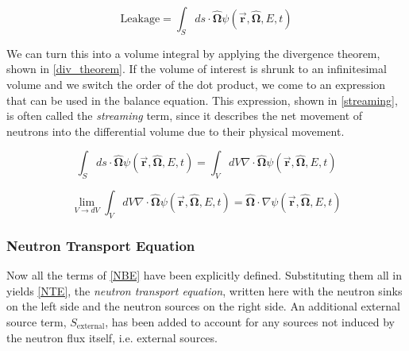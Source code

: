 \begin{equation}
\label{leakage_surface}
\mathrm{Leakage} = \int_S ds \cdot \boldsymbol{\hat{\Omega}} \psi(\boldsymbol{\vec{r}},\boldsymbol{\hat{\Omega}},E,t)
\end{equation}
 
 We can turn this into a volume integral by applying the divergence theorem, shown in \eqref{div_theorem}.  If the volume of interest is shrunk to an infinitesimal volume and we switch the order of the dot product, we come to an expression that can be used in the balance equation.  This expression, shown in \eqref{streaming}, is often called the \emph{streaming} term, since it describes the net movement of neutrons into the differential volume due to their physical movement.
 
\begin{equation}
\label{div_theorem}
\int_S ds \cdot \boldsymbol{\hat{\Omega}} \psi(\boldsymbol{\vec{r}},\boldsymbol{\hat{\Omega}},E,t) = \int_V dV \nabla \cdot \boldsymbol{\hat{\Omega}}  \psi(\boldsymbol{\vec{r}},\boldsymbol{\hat{\Omega}},E,t)
\end{equation}

\begin{equation}
\label{streaming}
 \lim_{V\to dV} \int_V dV \nabla \cdot \boldsymbol{\hat{\Omega}}  \psi(\boldsymbol{\vec{r}},\boldsymbol{\hat{\Omega}},E,t) =  \boldsymbol{\hat{\Omega}}  \cdot \nabla\psi(\boldsymbol{\vec{r}},\boldsymbol{\hat{\Omega}},E,t) 
 \end{equation}
 

\subsubsection{Neutron Transport Equation}

Now all the terms of \eqref{NBE} have been explicitly defined.  Substituting them all in yields \eqref{NTE}, the \emph{neutron transport equation}, written here with the neutron sinks on the left side and the neutron sources on the right side.  An additional external source term, $S_{\mathrm{external}}$, has been added to account for any sources not induced by the neutron flux itself, i.e. external sources.  

